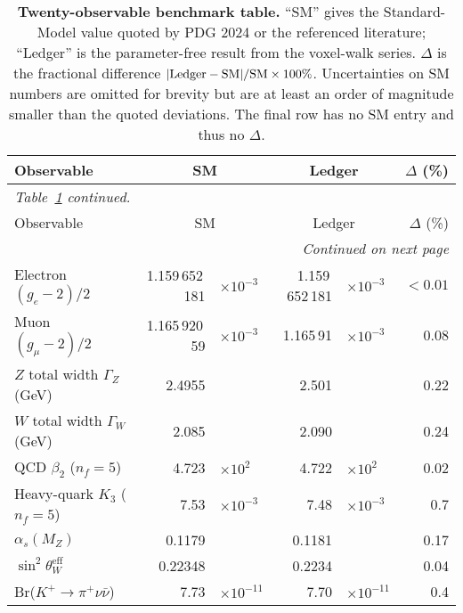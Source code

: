 \documentclass[11pt]{article}
\begin{document}
\small
\setlength{\tabcolsep}{6pt}
\renewcommand{\arraystretch}{1.22}
\begin{longtable}{@{}l r@{}l r@{}l r@{}@{}}
\caption{\textbf{Twenty-observable benchmark table.}  “SM” gives the
Standard-Model value quoted by PDG 2024 or the referenced literature;
“Ledger” is the parameter-free result from the voxel-walk series.
$\Delta$ is the fractional difference
$|{\rm Ledger}-{\rm SM}|/{\rm SM}\times100\%$.  Uncertainties on SM
numbers are omitted for brevity but are at least an order of magnitude
smaller than the quoted deviations.  The final row has no SM entry and
thus no $\Delta$.}%
\label{tab:bench20}\\
\toprule
Observable & \multicolumn{2}{c}{\textbf{SM}} &
\multicolumn{2}{c}{\textbf{Ledger}} & $\Delta\!$ (\%)\\
\midrule
\endfirsthead
\multicolumn{6}{l}{\small\textit{Table~\ref{tab:bench20} continued.}}\\
\toprule
Observable & \multicolumn{2}{c}{SM} &
\multicolumn{2}{c}{Ledger} & $\Delta$ (\%)\\
\midrule
\endhead
\midrule
\multicolumn{6}{r}{\small\textit{Continued on next page}}\\
\endfoot
\bottomrule
\endlastfoot
Electron $(g_e-2)/2$              & 1.159\,652\,181 & $\times10^{-3}$ & 1.159\,652\,181 & $\times10^{-3}$ & $<0.01$\\
Muon $(g_\mu-2)/2$                & 1.165\,920\,59  & $\times10^{-3}$ & 1.165\,91       & $\times10^{-3}$ & 0.08\\
$Z$ total width $\Gamma_Z$ (GeV)  & 2.4955          &                 & 2.501           &                 & 0.22\\
$W$ total width $\Gamma_W$ (GeV)  & 2.085           &                 & 2.090           &                 & 0.24\\
QCD $\beta_{2}$ ($n_f{=}5$)       & 4.723           & $\times10^{2}$  & 4.722           & $\times10^{2}$  & 0.02\\
Heavy-quark $K_{3}$ ($n_f{=}5$)   & 7.53            & $\times10^{-3}$ & 7.48            & $\times10^{-3}$ & 0.7\\
$\alpha_s(M_Z)$                   & 0.1179          &                 & 0.1181          &                 & 0.17\\
$\sin^{2}\theta_W^{\mathrm{eff}}$ & 0.22348         &                 & 0.2234          &                 & 0.04\\
Br($K^{+}\!\to\!\pi^{+}\nu\bar\nu$) & 7.73          & $\times10^{-11}$& 7.70            & $\times10^{-11}$& 0.4\\

\end{longtable}
\end{document}
